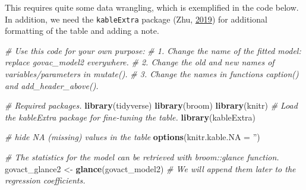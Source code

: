 \documentclass[doc,floatsintext]{apa6}
\newenvironment{Shaded}{\begin{snugshade}}{\end{snugshade}}
\newcommand{\KeywordTok}[1]{\textcolor[rgb]{0.13,0.29,0.53}{\textbf{#1}}}
\newcommand{\DataTypeTok}[1]{\textcolor[rgb]{0.13,0.29,0.53}{#1}}
\newcommand{\StringTok}[1]{\textcolor[rgb]{0.31,0.60,0.02}{#1}}
\newcommand{\CommentTok}[1]{\textcolor[rgb]{0.56,0.35,0.01}{\textit{#1}}}
\newcommand{\NormalTok}[1]{#1}
\begin{document}
This requires quite some data wrangling, which is exemplified in the
code below. In addition, we need the \texttt{kableExtra} package (Zhu,
\protect\hyperlink{ref-R-kableExtra}{2019}) for additional formatting of
the table and adding a note.

\begin{Shaded}
\begin{Highlighting}[]
\CommentTok{# Use this code for your own purpose:}
\CommentTok{# 1. Change the name of the fitted model: replace govac_model2 everywhere.}
\CommentTok{# 2. Change the old and new names of variables/parameters in mutate().}
\CommentTok{# 3. Change the names in functions caption() and add_header_above().}

\CommentTok{# Required packages.}
\KeywordTok{library}\NormalTok{(tidyverse)}
\KeywordTok{library}\NormalTok{(broom)}
\KeywordTok{library}\NormalTok{(knitr)}
\CommentTok{# Load the kableExtra package for fine-tuning the table.}
\KeywordTok{library}\NormalTok{(kableExtra)}

\CommentTok{# hide NA (missing) values in the table}
\KeywordTok{options}\NormalTok{(}\DataTypeTok{knitr.kable.NA =} \StringTok{''}\NormalTok{)}
 
\CommentTok{# The statistics for the model can be retrieved with broom::glance function.}
\NormalTok{govact_glance2 <-}\StringTok{ }\KeywordTok{glance}\NormalTok{(govact_model2)}
\CommentTok{# We will append them later to the regression coefficients.}


\end{Highlighting}
\end{Shaded}
\end{document}
